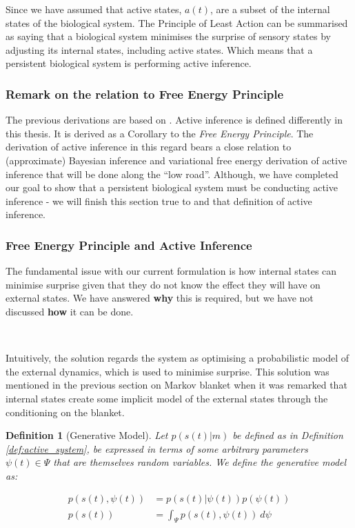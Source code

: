 \documentclass{article}
\newtheorem{definition}{Definition}
\begin{document}
Since we have assumed that active states, $a(t)$, are a subset of the internal states of the biological system. The Principle of Least Action can be summarised as saying that a biological system minimises the surprise of sensory states by adjusting its internal states, including active states. Which means that a persistent biological system is performing active inference.

\subsubsection{Remark on the relation to Free Energy Principle}

The previous derivations are based on \citet{friston2012active}. Active inference is defined differently in this thesis. It is derived as a Corollary to the \textit{Free Energy Principle}. The derivation of active inference in this regard bears a close relation to (approximate) Bayesian inference and variational free energy derivation of active inference that will be done along the ``low road''. Although, we have completed our goal to show that a persistent biological system must be conducting active inference - we will finish this section true to \citet{friston2012free} and that definition of active inference.

\subsubsection{Free Energy Principle and Active Inference}

The fundamental issue with our current formulation is how internal states can minimise surprise given that they do not know the effect they will have on external states. We have answered \textbf{why} this is required, but we have not discussed \textbf{how} it can be done.

\

Intuitively, the solution regards the system as optimising a probabilistic model of the external dynamics, which is used to minimise surprise. This solution was mentioned in the previous section on Markov blanket when it was remarked that internal states create some implicit model of the external states through the conditioning on the blanket.

\begin{definition}[Generative Model]\label{def:generative_model}
Let $p(s(t)|m)$ be defined as in Definition \ref{def:active_system}, be expressed in terms of some arbitrary parameters $\psi(t) \in \Psi$ that are themselves random variables. We define the generative model as:

\begin{equation*}
	\begin{aligned}
		p(s(t), \psi(t)) &= p(s(t)|\psi(t))p(\psi(t)) \\
		p(s(t)) &= \int_\Psi p(s(t), \psi(t)) \ d\psi
	\end{aligned}
\end{equation*}
\end{definition}
\end{document}
